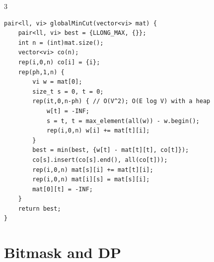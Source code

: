 \documentclass[9pt,a4paper]{extarticle}
\begin{document}
\begin{multicols*}{3}
\begin{lstlisting}
pair<ll, vi> globalMinCut(vector<vi> mat) {
    pair<ll, vi> best = {LLONG_MAX, {}};
    int n = (int)mat.size();
    vector<vi> co(n);
    rep(i,0,n) co[i] = {i};
    rep(ph,1,n) {
        vi w = mat[0];
        size_t s = 0, t = 0;
        rep(it,0,n-ph) { // O(V^2); O(E log V) with a heap
            w[t] = -INF;
            s = t, t = max_element(all(w)) - w.begin();
            rep(i,0,n) w[i] += mat[t][i];
        }
        best = min(best, {w[t] - mat[t][t], co[t]});
        co[s].insert(co[s].end(), all(co[t]));
        rep(i,0,n) mat[s][i] += mat[t][i];
        rep(i,0,n) mat[i][s] = mat[s][i];
        mat[0][t] = -INF;
    }
    return best;
}
\end{lstlisting}

\section{Bitmask and DP}


\end{multicols*}
\end{document}
